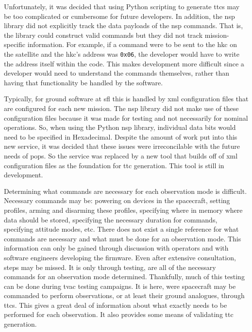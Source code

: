 Unfortunately, it was decided that using Python scripting to generate
\glspl{ttc} may be too complicated or cumbersome for future developers. In
addition, the \gls{nsp} library did not explicitly track the data payloads of
the \gls{nsp} commands. That is, the library could construct valid commands but
they did not track mission-specific information. For example, if a command were
to be sent to the \gls{hkc} on the satellite and the \gls{hkc}'s address was
\texttt{0x06}, the developer would have to write the address itself within the
code. This makes development more difficult since a developer would need to
understand the commands themselves, rather than having that functionality be
handled by the software. 

Typically, for ground software at \gls{sfl} this is handled by \gls{xml}
configuration files that are configured for each new mission.  The \gls{nsp}
library did not make use of these configuration files because it was made for
testing and not necessarily for nominal operations. So, when using the Python
\gls{nsp} library, individual data bits would need to be specified in
Hexadecimal.  Despite the amount of work put into this new service, it was
decided that these issues were irreconcilable with the future needs of
\gls{pops}. So the service was replaced by a new tool that builds off of
\gls{xml} configuration files as the foundation for \gls{ttc} generation.  This
tool is still in development.

Determining what commands are necessary for each observation mode is difficult.
Necessary commands may be: powering on devices in the spacecraft, setting
profiles, arming and disarming these profiles, specifying where in memory where
data should be stored, specifying the necessary duration for commands,
specifying attitude modes, etc.  There does not exist a single reference for
what commands are necessary and what must be done for an observation mode. This
information can only be gained through discussion with operators and with
software engineers developing the firmware.  Even after extensive consultation,
steps may be missed. It is only through testing, are all of the necessary
commands for an observation mode determined.  Thankfully, much of this testing
can be done during \gls{tvac} testing campaigns. It is here, were spacecraft
may be commanded to perform observations, or at least their ground analogues,
through \glspl{ttc}.  This gives a great deal of information about what exactly
needs to be performed for each observation. It also provides some means of
validating \gls{ttc} generation.


